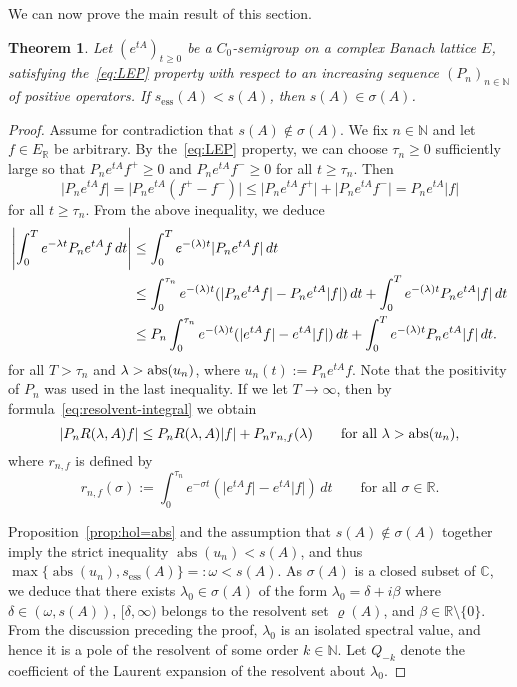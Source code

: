 \documentclass[sn-mathphys]{sn-jnl}%
\theoremstyle{thmstyleone}
\newtheorem{theorem}{Theorem}[section]
\theoremstyle{thmstylethree}
\DeclareMathOperator{\abs}{abs}
\let\Re\relax
\DeclareMathOperator{\Re}{Re}
\newcommand{\NN}{\mathbb{N}}
\newcommand{\RR}{\mathbb{R}}
\newcommand{\CC}{\mathbb{C}}
\begin{document}
We can now prove the main result of this section.
\begin{theorem}
	\label{thm:spectral-bound}
	Let $(e^{tA})_{t\ge 0}$ be a $C_0$-semigroup on a complex Banach lattice $E$, satisfying the~\eqref{eq:LEP} property with respect to an increasing sequence $(P_n)_{n\in\NN}$ of positive operators. If $s_{\mathrm{ess}}(A)<s(A)$, then $s(A)\in\sigma(A)$.
\end{theorem}
\begin{proof}
	Assume for contradiction that $s(A)\not\in\sigma(A)$. We fix $n\in\NN$ and let $f\in E_\RR$ be arbitrary. By the~\eqref{eq:LEP} property, we can choose $\tau_n\ge 0$ sufficiently large so that $P_n e^{tA}f^+\ge 0$ and $P_n e^{tA}f^-\ge 0$ for all $t\ge\tau_n$. Then
	\begin{equation*}
		\lvert P_n e^{tA}f\rvert=\lvert P_n e^{tA}(f^+ - f^-)\rvert \le \lvert P_n e^{tA}f^+\rvert+\lvert P_n e^{tA}f^-\rvert = P_n e^{tA}\lvert f\rvert
	\end{equation*}
	for all $t\ge\tau_n$. From the above inequality, we deduce
	\begin{align*}
		\left\lvert\int_0^T e^{-\lambda t}P_n e^{tA}f\,dt\right\rvert &\le \int_0^T e^{-(\Re\lambda)t}\lvert P_n e^{tA}f\rvert\,dt \\
		&\le \int_0^{\tau_n} e^{-(\Re\lambda)t}(\lvert P_n e^{tA}f\rvert-P_n e^{tA}\lvert f\rvert)\,dt + \int_0^T e^{-(\Re\lambda)t}P_n e^{tA}\lvert f\rvert\,dt \\
		&\le P_n \int_0^{\tau_n} e^{-(\Re\lambda)t}(\lvert e^{tA}f\rvert-e^{tA}\lvert f\rvert)\,dt + \int_0^T e^{-(\Re\lambda)t}P_n e^{tA}\lvert f\rvert\,dt.
	\end{align*}
	for all $T>\tau_n$ and $\Re\lambda >\abs(u_n)$, where $u_n(t):=P_n e^{tA}f$. Note that the positivity of $P_n$ was used in the last inequality. If we let $T\to\infty$, then by formula~\eqref{eq:resolvent-integral} we obtain
	\begin{equation}
		\label{eq:Pn-resolvent-est}
		\lvert P_n R(\lambda,A)f\rvert \le P_n R(\Re\lambda,A)\lvert f\rvert + P_n r_{n,f}(\Re\lambda) \qquad\text{for all }\Re\lambda >\abs(u_n),
	\end{equation}
	where $r_{n,f}$ is defined by
	\begin{equation}
		\label{eq:rnf}
		r_{n,f}(\sigma):=\int_0^{\tau_n} e^{-\sigma t}(\lvert e^{tA}f\rvert-e^{tA}\lvert f\rvert)\,dt \qquad\text{for all }\sigma\in\RR.
	\end{equation}
	
	Proposition~\ref{prop:hol=abs} and the assumption that $s(A)\not\in\sigma(A)$ together imply the strict inequality $\abs(u_n)<s(A)$, and thus $\max\{\abs(u_n), s_{\mathrm{ess}}(A)\}=:\omega<s(A)$. As $\sigma(A)$ is a closed subset of $\CC$, we deduce that there exists $\lambda_0\in\sigma(A)$ of the form $\lambda_0=\delta+i\beta$ where $\delta\in (\omega, s(A))$, $[\delta,\infty)$ belongs to the resolvent set $\varrho(A)$, and $\beta\in\RR\setminus\{0\}$. From the discussion preceding the proof, $\lambda_0$ is an isolated spectral value, and hence it is a pole of the resolvent of some order $k\in\NN$. Let $Q_{-k}$ denote the coefficient of the Laurent expansion of the resolvent about $\lambda_0$.
	

\end{proof}
\end{document}
